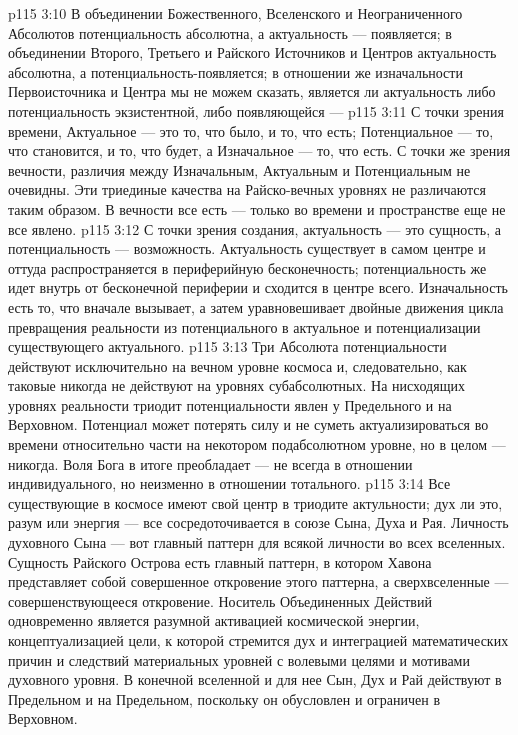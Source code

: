 \vs p115 3:10 В объединении Божественного, Вселенского и Неограниченного Абсолютов потенциальность абсолютна, а актуальность --- появляется; в объединении Второго, Третьего и Райского Источников и Центров актуальность абсолютна, а потенциальность\hyp{}появляется; в отношении же изначальности Первоисточника и Центра мы не можем сказать, является ли актуальность либо потенциальность экзистентной, либо появляющейся --- 
\vs p115 3:11 С точки зрения времени, Актуальное --- это то, что было, и то, что есть; Потенциальное --- то, что становится, и то, что будет, а Изначальное --- то, что есть. С точки же зрения вечности, различия между Изначальным, Актуальным и Потенциальным не очевидны. Эти триединые качества на Райско\hyp{}вечных уровнях не различаются таким образом. В вечности все есть --- только во времени и пространстве еще не все явлено.
\vs p115 3:12 С точки зрения создания, актуальность --- это сущность, а потенциальность --- возможность. Актуальность существует в самом центре и оттуда распространяется в периферийную бесконечность; потенциальность же идет внутрь от бесконечной периферии и сходится в центре всего. Изначальность есть то, что вначале вызывает, а затем уравновешивает двойные движения цикла превращения реальности из потенциального в актуальное и потенциализации существующего актуального.
\vs p115 3:13 Три Абсолюта потенциальности действуют исключительно на вечном уровне космоса и, следовательно, как таковые никогда не действуют на уровнях субабсолютных. На нисходящих уровнях реальности триодит потенциальности явлен у Предельного и на Верховном. Потенциал может потерять силу и не суметь актуализироваться во времени относительно части на некотором подабсолютном уровне, но в целом --- никогда. Воля Бога в итоге преобладает --- не всегда в отношении индивидуального, но неизменно в отношении тотального.
\vs p115 3:14 Все существующие в космосе имеют свой центр в триодите актульности; дух ли это, разум или энергия --- все сосредоточивается в союзе Сына, Духа и Рая. Личность духовного Сына --- вот главный паттерн для всякой личности во всех вселенных. Сущность Райского Острова есть главный паттерн, в котором Хавона представляет собой совершенное откровение этого паттерна, а сверхвселенные --- совершенствующееся откровение. Носитель Объединенных Действий одновременно является разумной активацией космической энергии, концептуализацией цели, к которой стремится дух и интеграцией математических причин и следствий материальных уровней с волевыми целями и мотивами духовного уровня. В конечной вселенной и для нее Сын, Дух и Рай действуют в Предельном и на Предельном, поскольку он обусловлен и ограничен в Верховном.
